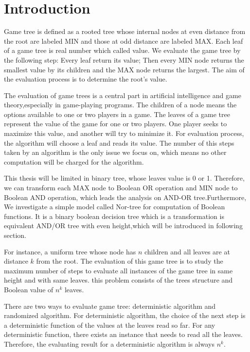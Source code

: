 \chapter{Introduction}

 Game tree is defined as a rooted tree whose internal nodes at even distance from the root are labeled MIN and those at odd distance are labeled MAX.\cite{GT} Each leaf of a game tree is real number which called value. We evaluate the game tree by the following step: Every leaf return its value; Then every MIN node returns the smallest value by its children and the MAX node returns the largest. The aim of the evaluation process is to determine the root's value.

 The evaluation of game trees is a central part in artificial intelligence and game theory,especially in game-playing programs. The children of a node means the options available to one or two players in a game. The leaves of a game tree represent the value of the game for one or two players. One player seeks to maximize this value, and another will try to minimize it. \cite{MCS}For evaluation process, the algorithm will choose a leaf and reads its value. The number of this steps taken by an algorithm is the only issue we focus on, which means no other computation will be charged for the algorithm.
 
 This thesis will be limited in binary tree, whose leaves value is 0 or 1. Therefore, we can transform each MAX node to Boolean OR operation and MIN node to Boolean AND operation, which leads the analysis on AND-OR tree.Furthermore, We investigate a simple model called Nor-tree for computation of Boolean functions. It is a binary boolean decision tree which is a transformation is equivalent AND/OR tree with even height,which will be introduced in following section. 
 
 For instance, a uniform tree whose node has $n$ children and all leaves are at distance $k$ from the root. The evaluation of this game tree is to study the maximum number of steps to evaluate all instances of the game tree in same height and with same leaves. this problem consists of the trees structure and Boolean value of $n^k$ leaves.
 
 There are two ways to evaluate game tree: deterministic algorithm and randomized algorithm. For deterministic algorithm, the choice of the next step is a deterministic function of the values at the leaves read so far. For any deterministic function, there exists an instance that needs to read all the leaves. Therefore, the evaluating result for a deterministic algorithm is always $n^k$. \cite{DETER}
 
